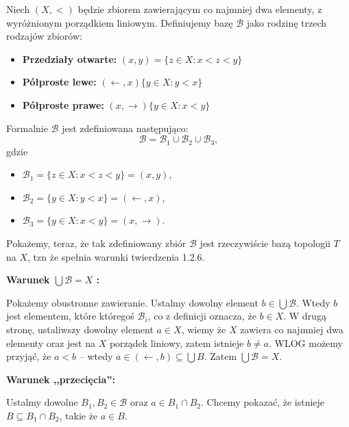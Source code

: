 \begin{eg}[1.2.8 $T(<)$]
	Niech $\left( X, < \right) $ będzie zbiorem zawierającym co najmniej dwa elementy, z wyróżnionym porządkiem liniowym. Definiujemy bazę $\mathcal{B}$ jako rodzinę trzech rodzajów zbiorów:
			\begin{itemize}
				\item \textbf{Przedziały otwarte:} $\left( x,y \right) = \{z \in X: x < z < y\} $
				\item \textbf{Półproste lewe:} $ \left( \leftarrow , x \right) \{y \in X: y < x\} $
				\item \textbf{Półproste prawe:} $\left( x, \rightarrow  \right) \{y \in X : x < y\} $
			\end{itemize}
\noindent Formalnie $\mathcal{B}$ jest zdefiniowana następująco:
	\[
	\mathcal{B} = \mathcal{B}_{1}\cup \mathcal{B}_{2} \cup \mathcal{B}_{3}
	,\] 
	gdzie
	\begin{itemize}
		\item $\mathcal{B}_{1} = \{z\in X: x<z<y\} = \left( x,y \right) $,
		\item $\mathcal{B}_{2} = \{y \in X: y < x\} = \left( \leftarrow, x \right) $,
		\item $\mathcal{B}_{3} = \{y \in X: x < y\} = \left( x, \rightarrow  \right) $.
	\end{itemize}
	Pokażemy, teraz, że tak zdefiniowany zbiór $\mathcal{B}$ jest rzeczywiście bazą topologii $T$ na $X$, tzn że spełnia warunki twierdzenia 1.2.6.

\noindent \textbf{Warunek $\bigcup \mathcal{B} = X $ :}

Pokażemy obustronne zawieranie. Ustalmy dowolny element $b \in \bigcup \mathcal{B}$. Wtedy $b$ jest elementem, które któregoś $\mathcal{B}_{i}$, co z definicji oznacza, że $b\in X$. W drugą stronę, ustaliwszy dowolny element $a \in X$, wiemy że $X$ zawiera co najmniej dwa elementy oraz jest na $X$ porządek liniowy, zatem istnieje $b\neq a$. WLOG możemy przyjąć, że $a<b$ -- wtedy  $a \in \left( \leftarrow, b \right) \subseteq \bigcup B $. Zatem $\bigcup \mathcal{B} = X$.

\noindent\textbf{ Warunek ,,przecięcia'': } 

Ustalmy dowolne $B_1,B_2 \in \mathcal{B}$ oraz $a \in B_1\cap B_2$. Chcemy pokazać, że istnieje $B \subseteq B_1\cap B_2$, takie że $a \in B$.


\end{eg}
